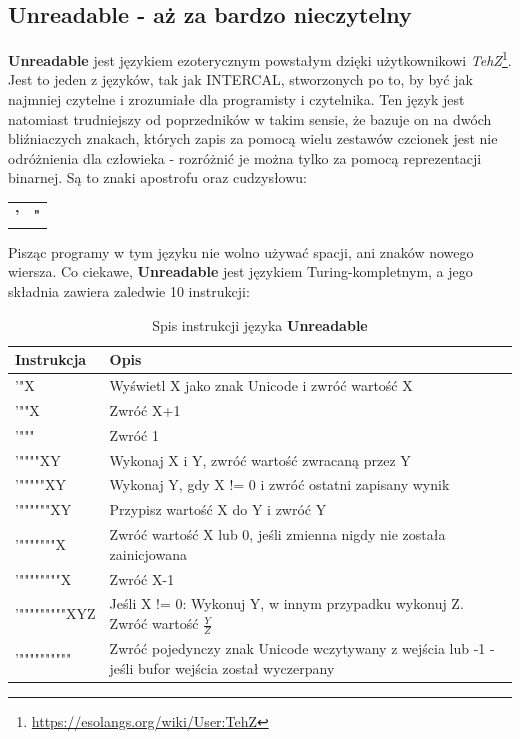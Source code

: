\documentclass[fleqn,10pt]{SelfArx} %
\newcommand{\tabline}{\tabularnewline\hline}
\begin{document}
\subsection{Unreadable - aż za bardzo nieczytelny}
\textbf{Unreadable} jest językiem ezoterycznym powstałym dzięki użytkownikowi \textit{TehZ}\footnote{\url{https://esolangs.org/wiki/User:TehZ}}. Jest to jeden z języków, tak jak INTERCAL, stworzonych po to, by być jak najmniej czytelne i zrozumiałe dla programisty i czytelnika. Ten język jest natomiast trudniejszy od poprzedników w takim sensie, że bazuje on na dwóch bliźniaczych znakach, których zapis za pomocą wielu zestawów czcionek jest nie odróżnienia dla człowieka - rozróżnić je można tylko za pomocą reprezentacji binarnej. Są to znaki apostrofu oraz cudzysłowu:
\begin{table}[H]
	\begin{center}
	\begin{tabular}{lr}
	\textbf{'} & \textbf{"}
	\end{tabular}
	\end{center}
\end{table}
Pisząc programy w tym języku nie wolno używać spacji, ani znaków nowego wiersza.
Co ciekawe, \textbf{Unreadable} jest językiem Turing-kompletnym, a jego składnia zawiera zaledwie 10 instrukcji\cite{esolangWiki:unreadable}:
\begin{table}[H]
	\begin{center}
		\begin{tabular}{| >{\centering}p{2cm} | >{\centering}p{5cm}|}
			\hline
			\textbf{Instrukcja} & \textbf{Opis} \tabline
			'"X & Wyświetl X jako znak Unicode i zwróć wartość X \tabline
			'""X & Zwróć X+1 \tabline
			'""" & Zwróć 1 \tabline
			'""""XY & Wykonaj X i Y, zwróć wartość zwracaną przez Y\tabline
			'"""""XY & Wykonaj Y, gdy X != 0 i zwróć ostatni zapisany wynik\tabline
			'""""""XY & Przypisz wartość X do Y i zwróć Y \tabline
			'"""""""X & Zwróć wartość X lub 0, jeśli zmienna nigdy nie została zainicjowana \tabline
			'""""""""X & Zwróć X-1 \tabline
			'"""""""""XYZ & Jeśli X != 0: Wykonuj Y, w innym przypadku wykonuj Z. Zwróć wartość $\frac{Y}{Z}$ \tabline
			'"""""""""" & Zwróć pojedynczy znak Unicode wczytywany z wejścia lub -1 - jeśli bufor wejścia został wyczerpany \tabline
		\end{tabular}
	\end{center}
	\caption{\centering Spis instrukcji języka \textbf{Unreadable}}
	\label{tab:unreadableInstrukcje}
\end{table}
\end{document}
